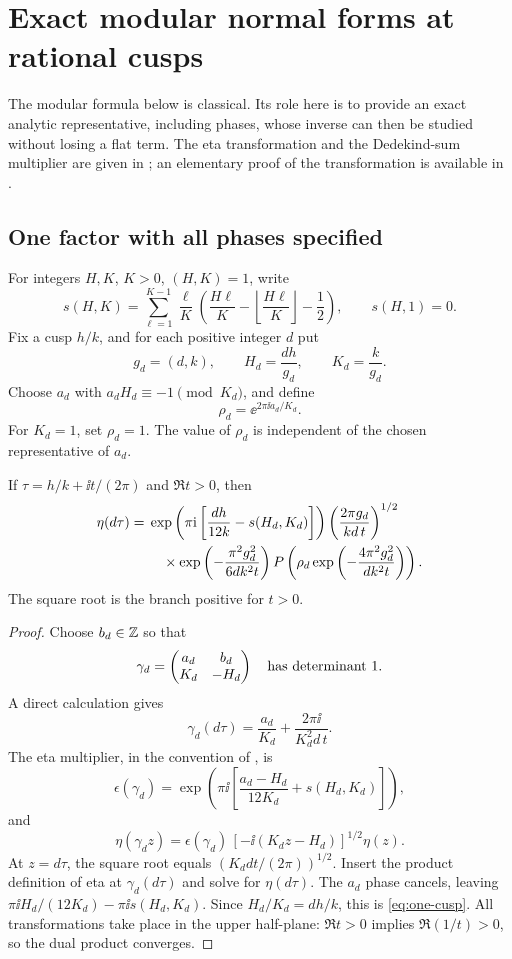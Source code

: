 \section{Exact modular normal forms at rational cusps}\label{sec:cusps}

The modular formula below is classical.  Its role here is to provide
an exact analytic representative, including phases, whose inverse
can then be studied without losing a flat term.
The eta transformation and the Dedekind-sum multiplier are given in
\cite[Equations 23.18.5--23.18.7]{dlmf-eta}; an elementary proof of the
transformation is available in \cite{kong-teo}.

\subsection{One factor with all phases specified}

For integers \(H,K\), \(K>0\), \((H,K)=1\), write
\[
 s(H,K)=\sum_{\ell=1}^{K-1}
 \frac{\ell}{K}
 \left(\frac{H\ell}{K}
       -\left\lfloor\frac{H\ell}{K}\right\rfloor-\frac12\right),
 \qquad s(H,1)=0 .
\]
Fix a cusp \(h/k\), and for each positive integer \(d\) put
\[
 g_d=(d,k),\qquad H_d=\frac{dh}{g_d},\qquad K_d=\frac{k}{g_d}.
\]
Choose \(a_d\) with \(a_dH_d\equiv-1\pmod{K_d}\), and define
\[
 \rho_d=\ee^{2\pi\ii a_d/K_d}.
\]
For \(K_d=1\), set \(\rho_d=1\).
The value of \(\rho_d\) is independent of the chosen representative
of \(a_d\).

\begin{lemma}\label{lem:one-cusp}
If \(\tau=h/k+\ii t/(2\pi)\) and \(\Re t>0\), then
\begin{align}
 \eta(d\tau)
 ={}&\exp\left(\pi\mathrm i\left[
          \frac{dh}{12k}-s(H_d,K_d)\right]\right)
 \left(\frac{2\pi g_d}{kd\,t}\right)^{1/2}\notag\\
 &\quad{}\times
 \exp\left(-\frac{\pi^2g_d^2}{6dk^2t}\right)
 P\left(\rho_d
       \exp\left(-\frac{4\pi^2g_d^2}{dk^2t}\right)\right).
 \label{eq:one-cusp}
\end{align}
The square root is the branch positive for \(t>0\).
\end{lemma}
\begin{proof}
Choose \(b_d\in\mathbb Z\) so that
\[
 \gamma_d=
 \begin{pmatrix}a_d&b_d\\K_d&-H_d\end{pmatrix}
 \quad\hbox{has determinant }1.
\]
A direct calculation gives
\[
 \gamma_d(d\tau)=\frac{a_d}{K_d}
                  +\frac{2\pi\ii}{K_d^2d\,t}.
\]
The eta multiplier, in the convention of \cite{dlmf-eta}, is
\[
 \epsilon(\gamma_d)=
 \exp\left(\pi\ii\left[
      \frac{a_d-H_d}{12K_d}+s(H_d,K_d)\right]\right),
\]
and
\[
 \eta(\gamma_d z)
   =\epsilon(\gamma_d)\,[-\ii(K_dz-H_d)]^{1/2}\eta(z).
\]
At \(z=d\tau\), the square root equals
\((K_ddt/(2\pi))^{1/2}\).
Insert the product definition of eta at \(\gamma_d(d\tau)\)
and solve for \(\eta(d\tau)\).  The \(a_d\) phase cancels, leaving
\(\pi\ii H_d/(12K_d)-\pi\ii s(H_d,K_d)\).
Since \(H_d/K_d=dh/k\), this is \cref{eq:one-cusp}.
All transformations take place in the upper half-plane:
\(\Re t>0\) implies \(\Re(1/t)>0\), so the dual product converges.
\end{proof}

